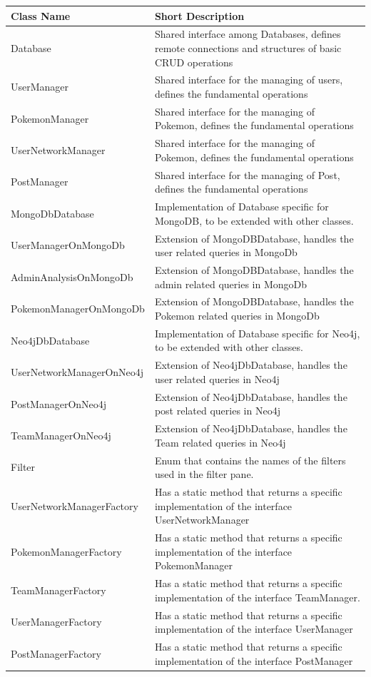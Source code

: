 \begin{center}
	\begin{longtable}{| m{14em} | m{19em} |} 
		\hline
		\textbf{Class Name} & \textbf{Short Description} \\ [0.5ex] 
		\hline
		Database & Shared interface among Databases, defines remote connections and structures of basic CRUD operations\\ 
		\hline
		UserManager & Shared interface for the managing of users, defines the fundamental operations \\ 
		\hline
		PokemonManager & Shared interface for the managing of Pokemon, defines the fundamental operations \\ 
		\hline
		UserNetworkManager & Shared interface for the managing of Pokemon, defines the fundamental operations \\ 
		\hline
		PostManager & Shared interface for the managing of Post, defines the fundamental operations\\ 
		\hline
		MongoDbDatabase & Implementation of Database specific for MongoDB, to be extended with other classes.\\ 
		\hline
		UserManagerOnMongoDb & Extension of MongoDBDatabase, handles the user related queries in MongoDb\\ 
		\hline
		AdminAnalysisOnMongoDb & Extension of MongoDBDatabase, handles the admin related queries in MongoDb\\ 
		\hline
		PokemonManagerOnMongoDb & Extension of MongoDBDatabase, handles the Pokemon related queries in MongoDb\\ 
		\hline
		Neo4jDbDatabase & Implementation of Database specific for Neo4j, to be extended with other classes.\\ 
		\hline
		UserNetworkManagerOnNeo4j & Extension of Neo4jDbDatabase, handles the user related queries in Neo4j\\ 
		\hline
		PostManagerOnNeo4j & Extension of Neo4jDbDatabase, handles the post related queries in Neo4j\\
		\hline
		TeamManagerOnNeo4j & Extension of Neo4jDbDatabase, handles the Team related queries in Neo4j\\
		\hline
		Filter & Enum that contains the names of the filters used in the filter pane.\\
		\hline
		UserNetworkManagerFactory & Has a static method that returns a specific implementation of the interface UserNetworkManager\\
		\hline
		PokemonManagerFactory & Has a static method that returns a specific implementation of the interface PokemonManager\\
		\hline
		TeamManagerFactory & Has a static method that returns a specific implementation of the interface TeamManager.\\
		\hline
		UserManagerFactory & Has a static method that returns a specific implementation of the interface UserManager\\
		\hline
		PostManagerFactory & Has a static method that returns a specific implementation of the interface PostManager\\
		\hline
	\end{longtable}
\end{center}

